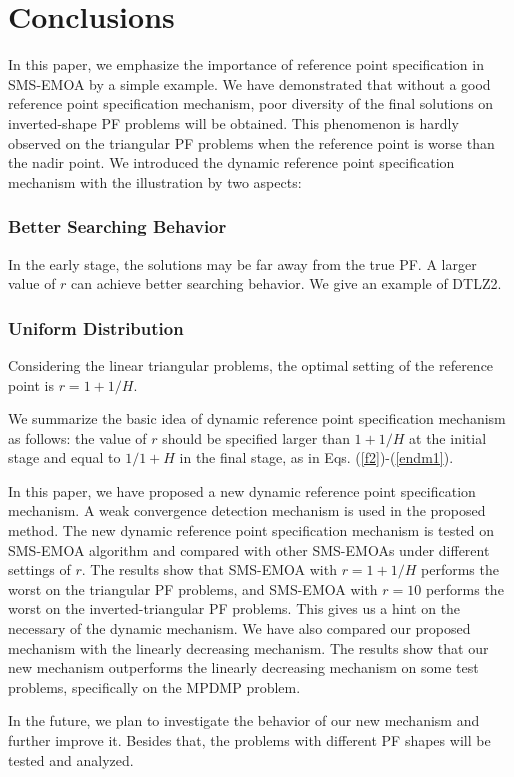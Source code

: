 \documentclass[conference]{IEEEtran}
\begin{document}
\section{Conclusions}

In this paper, we emphasize the importance of reference point specification 
in SMS-EMOA by a simple example. 
We have demonstrated that without a good reference point specification mechanism, 
poor diversity of the final solutions on inverted-shape PF problems will be obtained. 
This phenomenon is hardly observed on the triangular PF problems when the reference point is worse than the nadir point. 
We introduced the dynamic reference point specification mechanism with the illustration by two aspects: 
\subsubsection{Better Searching Behavior} In the early stage, 
the solutions may be far away from the true PF. 
A larger value of $r$ can achieve better searching behavior.  
We give an example of DTLZ2. 
\subsubsection{Uniform Distribution} Considering the linear triangular problems, 
the optimal setting of the reference point is $r=1+1/H$. 

We summarize the basic idea of dynamic reference point specification mechanism as follows: 
the value of $r$ should be specified larger than $1+1/H$ at the initial stage 
and equal to $1/1+H$ in the final stage, as in Eqs. (\ref{f2})-(\ref{endm1}). 

In this paper, we have proposed a new dynamic reference point specification mechanism. 
A weak convergence detection mechanism is used in the proposed method. 
The new dynamic reference point specification mechanism is tested on SMS-EMOA algorithm 
and compared with other SMS-EMOAs under different settings of $r$. 
The results show that SMS-EMOA with $r=1+1/H$ performs the worst on the triangular PF problems, 
and SMS-EMOA with $r=10$ performs the worst on the inverted-triangular PF problems. 
This gives us a hint on the necessary of the dynamic mechanism. 
We have also compared our proposed mechanism with the linearly decreasing mechanism. 
The results show that our new mechanism outperforms the linearly decreasing mechanism on some test problems, 
specifically on the MPDMP problem. 

In the future, we plan to investigate the behavior of our new mechanism and further improve it. 
Besides that, the problems with different PF shapes will be tested and analyzed. 

 
 
\end{document}
